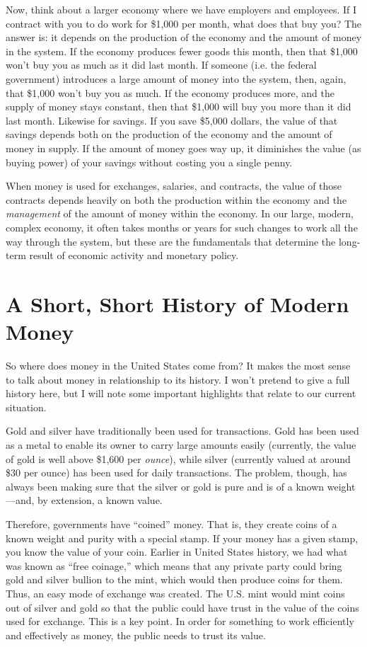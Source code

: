 Now, think about a larger economy where we have employers and employees.
If I contract with you to do work for \$1,000 per month, what does that
buy you?  The answer is: it depends on the production of the economy
and the amount of money in the system. If the economy produces fewer
goods this month, then that \$1,000 won’t buy you as much as it did
last month. If someone (i.e. the federal government) introduces a large amount of money into the
system, then, again, that \$1,000 won’t buy you as much. If the economy
produces more, and the supply of money stays constant, then that
\$1,000 will buy you more than it did last month. Likewise for savings.
If you save \$5,000 dollars, the value of that savings depends both on
the production of the economy and the amount of money in supply. If the
amount of money goes way up, it diminishes the value (as buying power)
of your savings without costing you a single penny.

When money is used for exchanges, salaries, and contracts, the value of
those contracts depends heavily on both the production within the
economy and the \textit{management} of the amount of money within the economy. 
In our large, modern, complex economy, it
often takes months or years for such changes to work all the way
through the system, but these are the fundamentals that determine the
long-term result of economic activity and monetary policy.

\section{A Short, Short History of Modern Money}

So where does money in the United States come from?  It makes the most
sense to talk about money in relationship to its history. I won’t
pretend to give a full history here, but I will note some important
highlights that relate to our current situation.  

Gold and silver have traditionally been used for transactions. Gold has
been used as a metal to enable its owner to carry large amounts easily
(currently, the value of gold is well above \$1,600 per
\textit{ounce}), while silver (currently valued at around \$30 per
ounce) has been used for daily transactions. The problem, though, has
always been making sure that the silver or gold is pure and is of a
known weight—and, by extension, a known value. 

Therefore, governments have “coined” money. That is, they create coins
of a known weight and purity with a special stamp. If your money has a
given stamp, you know the value of your coin. Earlier in United States
history, we had what was known as “free coinage,” which means that any
private party could bring gold and silver bullion to the mint, which
would then produce coins for them. Thus, an easy mode of exchange was
created. The U.S. mint would mint coins out of silver and gold so that
the public could have trust in the value of the coins used for
exchange. This is a key point. In order for something to work
efficiently and effectively as money, the public needs to trust its
value.

